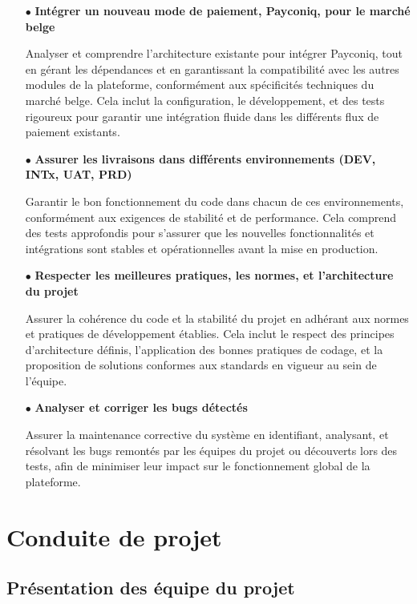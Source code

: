  \begin{itemize}
    \item[$\bullet$] \textbf{Intégrer un nouveau mode de paiement, Payconiq, pour le marché belge } 
    
    Analyser et comprendre l'architecture existante pour intégrer Payconiq, tout en gérant les dépendances et en garantissant la compatibilité avec les autres modules de la plateforme, conformément aux spécificités techniques du marché belge. Cela inclut la configuration, le développement, et des tests rigoureux pour garantir une intégration fluide dans les différents flux de paiement existants.

    \item[$\bullet$] \textbf{Assurer les livraisons dans différents environnements (DEV, INTx, UAT, PRD) } 
    
    Garantir le bon fonctionnement du code dans chacun de ces environnements, conformément aux exigences de stabilité et de performance. Cela comprend des tests approfondis pour s'assurer que les nouvelles fonctionnalités et intégrations sont stables et opérationnelles avant la mise en production.

    \item[$\bullet$] \textbf{Respecter les meilleures pratiques, les normes, et l'architecture du projet } 
    
    Assurer la cohérence du code et la stabilité du projet en adhérant aux normes et pratiques de développement établies. Cela inclut le respect des principes d'architecture définis, l'application des bonnes pratiques de codage, et la proposition de solutions conformes aux standards en vigueur au sein de l'équipe.

    \item[$\bullet$] \textbf{Analyser et corriger les bugs détectés }
    
    Assurer la maintenance corrective du système en identifiant, analysant, et résolvant les bugs remontés par les équipes du projet ou découverts lors des tests, afin de minimiser leur impact sur le fonctionnement global de la plateforme.

\end{itemize}

\section{Conduite de projet}

\subsection{Présentation des équipe du projet}

